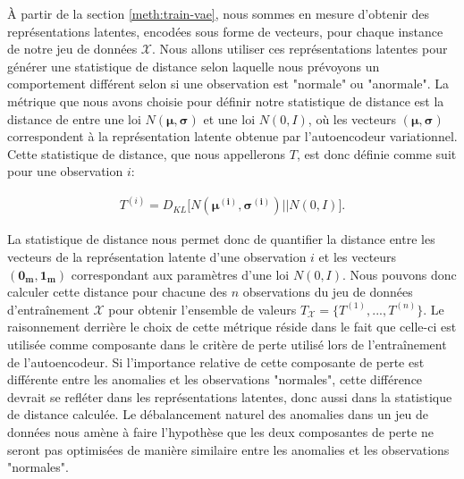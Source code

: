  À partir de la section \ref{meth:train-vae}, nous sommes en mesure d'obtenir des représentations latentes, encodées sous forme de vecteurs, pour chaque instance de notre jeu de données $\mathcal{X}$. Nous allons utiliser ces représentations latentes pour générer une statistique de distance selon laquelle nous prévoyons un comportement différent selon si une observation est "normale" ou "anormale". La métrique que nous avons choisie pour définir notre statistique de distance est la distance de \DIFdelbegin {}\DIFdelend \DIFaddbegin {}\DIFaddend entre une loi $N(\boldsymbol{\mu}, \boldsymbol{\sigma})$ et une loi $N(0,I)$, où les vecteurs $(\boldsymbol{\mu}, \boldsymbol{\sigma})$ correspondent à la représentation latente obtenue par l'autoencodeur variationnel. Cette statistique de distance, que nous appellerons $T$, est donc définie comme suit pour une observation $i$:

 \begin{gather}  \label{eq:metrique}
 T^{(i)} = D_{KL}\big[N(\boldsymbol{\mu^{(i)}}, \boldsymbol{\sigma^{(i)}}) || N(0, I)\big].
 \end{gather}

 La statistique de distance \DIFdelbegin {}\DIFdelend \DIFaddbegin {}\DIFaddend nous permet donc de quantifier la distance entre les vecteurs \DIFdelbegin \DIFdel{$(\boldsymbol{\mu}, \boldsymbol{\sigma})$ }\DIFdelend \DIFaddbegin {}\DIFaddend de la représentation latente d'une observation $i$ et les vecteurs $(\boldsymbol{0_m}, \boldsymbol{1_m})$ correspondant aux paramètres d'une loi $N(0,I)$. Nous pouvons donc calculer cette distance pour chacune des $n$ observations du jeu de données d'entraînement $\mathcal{X}$ pour obtenir l'ensemble de valeurs $T_{\mathcal{X}}=\{T^{(1)}, ..., T^{(n)}\}$. Le raisonnement derrière le choix de cette métrique réside dans le fait que celle-ci est utilisée comme composante dans le critère de perte utilisé lors de l'entraînement de l'autoencodeur. Si l'importance relative de cette composante de perte est différente entre les anomalies et les observations "normales", cette différence devrait se refléter dans les représentations latentes, donc aussi dans la statistique de distance calculée. Le débalancement naturel des anomalies dans un jeu de données nous amène à faire l'hypothèse que les deux composantes de perte ne seront pas optimisées de manière similaire entre les anomalies et les observations "normales".

